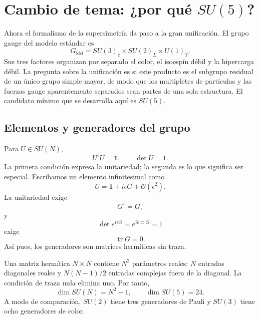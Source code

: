 \section{Cambio de tema: ¿por qué \texorpdfstring{\(SU(5)\)}{SU(5)}?}

Ahora el formalismo de la supersimetría da paso a la gran unificación. El grupo gauge del modelo estándar es
\begin{equation}
G_{\mathrm{SM}}
=SU(3)_c\times SU(2)_L\times U(1)_Y.
\label{eq:l9-sm-group}
\end{equation}
Sus tres factores organizan por separado el color, el isoespín débil y la hipercarga débil. La pregunta sobre la unificación es si este producto es el subgrupo residual de un único grupo simple mayor, de modo que los multipletes de partículas y las fuerzas gauge aparentemente separados sean partes de una sola estructura. El candidato mínimo que se desarrolla aquí es \(SU(5)\).

\subsection{Elementos y generadores del grupo}

Para \(U\in SU(N)\),
\begin{equation}
U^\dagger U=\mathbf1,
\qquad
\det U=1.
\label{eq:l9-SUN-def}
\end{equation}
La primera condición expresa la unitariedad; la segunda es lo que significa ser especial. Escribamos un elemento infinitesimal como
\begin{equation}
U=\mathbf1+i\epsilon G+\mathcal O(\epsilon^2).
\label{eq:l9-infinitesimal-U}
\end{equation}
La unitariedad exige
\begin{equation}
G^\dagger=G,
\end{equation}
y
\begin{equation}
\det e^{i\epsilon G}
=e^{i\epsilon\operatorname{tr}G}=1
\end{equation}
exige
\begin{equation}
\operatorname{tr}G=0.
\end{equation}
Así pues, los generadores son matrices hermíticas sin traza.

Una matriz hermítica \(N\times N\) contiene \(N^2\) parámetros reales: \(N\) entradas diagonales reales y \(N(N-1)/2\) entradas complejas fuera de la diagonal. La condición de traza nula elimina uno. Por tanto,
\begin{equation}
\dim SU(N)=N^2-1,
\qquad
\dim SU(5)=24.
\label{eq:l9-SU5-dimension}
\end{equation}
A modo de comparación, \(SU(2)\) tiene tres generadores de Pauli y \(SU(3)\) tiene ocho generadores de color.


